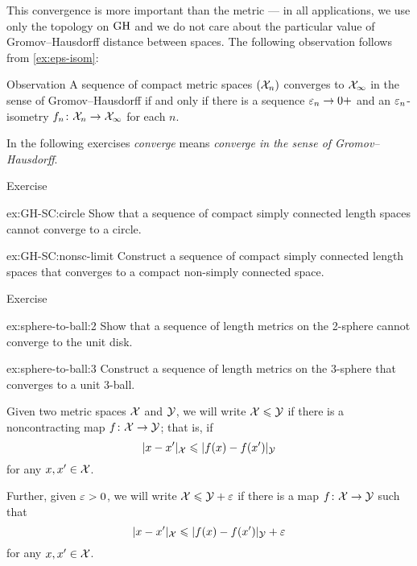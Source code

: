 This convergence is more important than the metric ---
in all applications, we use only the topology on $\operatorname{\rm GH}\nolimits$
and we do not care about the particular value of Gromov--Hausdorff distance between spaces.
The following observation follows from \ref{ex:eps-isom}:

\begin{thm}{Observation}\label{obs:GH-e-isom}
A sequence of compact metric spaces $(\mathcal{X}_n)$ converges to  $\mathcal{X}_\infty$ in the sense of Gromov--Hausdorff if and only if there is a sequence $\varepsilon_n\to0+$
and an $\varepsilon_n$-isometry $f_n\colon\mathcal{X}_n\to \mathcal{X}_\infty$ for each $n$.
\end{thm}

In the following exercises {}\emph{converge} means {}\emph{converge in the sense of Gromov--Hausdorff}.

\begin{thm}{Exercise}\label{ex:GH-SC}
\begin{subthm}{ex:GH-SC:circle}
Show that a sequence of compact simply connected length spaces cannot converge to a circle.
\end{subthm}

\begin{subthm}{ex:GH-SC:nonsc-limit}
Construct a sequence of compact simply connected length spaces that converges to a compact non-simply connected space.
\end{subthm}
\end{thm}

\begin{thm}{Exercise}\label{ex:sphere-to-ball}
\begin{subthm}{ex:sphere-to-ball:2}
Show that a sequence of length metrics on the 2-sphere cannot converge to the unit disk.
\end{subthm}

\begin{subthm}{ex:sphere-to-ball:3}
Construct a sequence of length metrics on the 3-sphere that converges to a unit 3-ball.
\end{subthm}

\end{thm}

Given two metric spaces $\mathcal{X}$ and $\mathcal{Y}$, we will write $\mathcal{X}\leqslant \mathcal{Y}$ if there is a noncontracting map $f\colon\mathcal{X}\to \mathcal{Y}$;
that is, if 
$$ |x-x'|_{\mathcal{X}}\leqslant|f(x)-f(x')|_{\mathcal{Y}}$$
for any $x,x'\in \mathcal{X}$.

Further, given $\varepsilon>0$, we will write $\mathcal{X}\leqslant \mathcal{Y}+\varepsilon$
if there is a map $f\colon\mathcal{X}\to \mathcal{Y}$ such that 
$$|x-x'|_{\mathcal{X}}\leqslant|f(x)-f(x')|_{\mathcal{Y}}+\varepsilon$$
for any $x,x'\in \mathcal{X}$.

